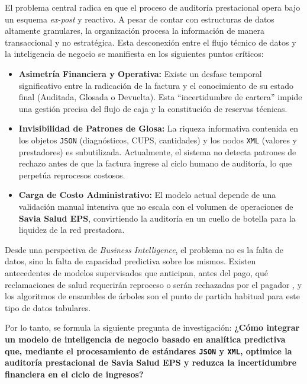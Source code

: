 \documentclass[12pt,letterpaper]{report}
\begin{document}
El problema central radica en que el proceso de auditoría prestacional opera bajo un esquema \textit{ex-post} y reactivo. A pesar de contar con estructuras de datos altamente granulares, la organización procesa la información de manera transaccional y no estratégica. Esta desconexión entre el flujo técnico de datos y la inteligencia de negocio se manifiesta en los siguientes puntos críticos:

\begin{itemize}
    \item \textbf{Asimetría Financiera y Operativa:} Existe un desfase temporal significativo entre la radicación de la factura y el conocimiento de su estado final (Auditada, Glosada o Devuelta). Esta ``incertidumbre de cartera'' impide una gestión precisa del flujo de caja y la constitución de reservas técnicas.
    \item \textbf{Invisibilidad de Patrones de Glosa:} La riqueza informativa contenida en los objetos \texttt{JSON} (diagnósticos, CUPS, cantidades) y los nodos \texttt{XML} (valores y prestadores) es subutilizada. Actualmente, el sistema no detecta patrones de rechazo antes de que la factura ingrese al ciclo humano de auditoría, lo que perpetúa reprocesos costosos.
    \item \textbf{Carga de Costo Administrativo:} El modelo actual depende de una validación manual intensiva que no escala con el volumen de operaciones de \textbf{Savia Salud EPS}, convirtiendo la auditoría en un cuello de botella para la liquidez de la red prestadora.
\end{itemize}

Desde una perspectiva de \textit{Business Intelligence}, el problema no es la falta de datos, sino la falta de capacidad predictiva sobre los mismos. Existen antecedentes de modelos supervisados que anticipan, antes del pago, qué reclamaciones de salud requerirán reproceso o serán rechazadas por el pagador \cite{kumar2010claims, kim2020deepclaim}, y los algoritmos de ensambles de árboles \cite{breiman2001, chen2016xgboost} son el punto de partida habitual para este tipo de datos tabulares.

Por lo tanto, se formula la siguiente pregunta de investigación: \textbf{¿Cómo integrar un modelo de inteligencia de negocio basado en analítica predictiva que, mediante el procesamiento de estándares \texttt{JSON} y \texttt{XML}, optimice la auditoría prestacional de Savia Salud EPS y reduzca la incertidumbre financiera en el ciclo de ingresos?}

\clearpage
\end{document}
